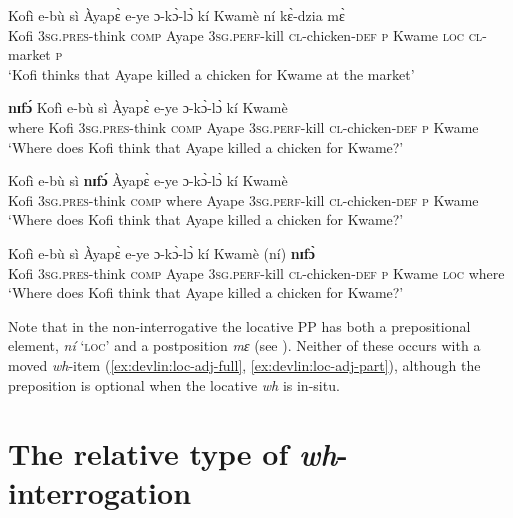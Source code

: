 \documentclass[output=paper]{langscibook}
\begin{document}
\ea \label{ex:devlin:loc-adj}
\begin{xlist}
\ex \label{ex:devlin:loc-adj-decl}
\gll Kof\`{i} e-b\`{u} s\`{i} \`{A}yap\`{ɛ} e-ye ɔ-k\`{ɔ}-l\`{ɔ} k\'{i} Kwam\`{e} n\'{i} k\`{ɛ}-dzia m\`{ɛ}\\ 
Kofi \textsc{3sg.pres}-think \textsc{comp} Ayape \textsc{3sg.perf}-kill \textsc{cl}-chicken-\textsc{def} \textsc{p} Kwame \textsc{loc} \textsc{cl}-market \textsc{p} \\ 
\glt `Kofi thinks that Ayape killed a chicken for Kwame at the market’

\ex \label{ex:devlin:loc-adj-full}
\gll \textbf{nɪf\'{ɔ}} Kof\`{i} e-b\`{u} s\`{i} \`{A}yap\`{ɛ} e-ye ɔ-k\`{ɔ}-l\`{ɔ} k\'{i} Kwam\`{e}\\
where Kofi \textsc{3sg.pres}-think \textsc{comp} Ayape \textsc{3sg.perf}-kill \textsc{cl}-chicken-\textsc{def} \textsc{p} Kwame \\
\glt `Where does Kofi think that Ayape killed a chicken for Kwame?’

\ex \label{ex:devlin:loc-adj-part}
\gll Kof\`{i} e-b\`{u} s\`{i} \textbf{nɪf\'{ɔ}} \`{A}yap\`{ɛ} e-ye ɔ-k\`{ɔ}-l\`{ɔ} k\'{i} Kwam\`{e}\\
Kofi \textsc{3sg.pres}-think \textsc{comp} where Ayape \textsc{3sg.perf}-kill \textsc{cl}-chicken-\textsc{def} \textsc{p} Kwame \\
\glt `Where does Kofi think that Ayape killed a chicken for Kwame?’

\ex \label{ex:devlin:loc-adj-insitu}
\gll Kof\`{i} e-b\`{u} s\`{i} \`{A}yap\`{ɛ} e-ye ɔ-k\`{ɔ}-l\`{ɔ} k\'{i} Kwam\`{e} (n\'{i}) \textbf{nɪf\`{ɔ}}\\
Kofi \textsc{3sg.pres}-think \textsc{comp} Ayape \textsc{3sg.perf}-kill \textsc{cl}-chicken-\textsc{def} \textsc{p} Kwame \textsc{loc} where \\
\glt `Where does Kofi think that Ayape killed a chicken for Kwame?’
\end{xlist}
\z


Note that in the non-interrogative  the locative PP has both a prepositional element, \textit{n\'{i}} `\textsc{loc}’ and a postposition \textit{mɛ} (see \citealt{ford:1971}). Neither of these occurs with a moved \textit{wh}-item (\ref{ex:devlin:loc-adj-full}, \ref{ex:devlin:loc-adj-part}), although the preposition is optional when the locative \textit{wh} is in-situ.


\section {The relative type of \textit{wh}-interrogation}
\end{document}
